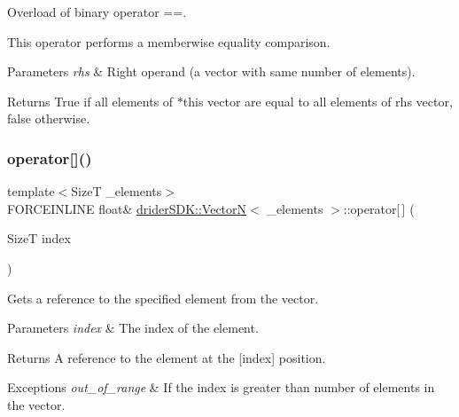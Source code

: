 Overload of binary operator ==.

This operator performs a memberwise equality comparison.


\begin{DoxyParams}{Parameters}
{\em rhs} & Right operand (a vector with same number of elements).\\
\hline
\end{DoxyParams}
\begin{DoxyReturn}{Returns}
True if all elements of $\ast$this vector are equal to all elements of rhs vector, false otherwise. 
\end{DoxyReturn}
\mbox{\label{classdrider_s_d_k_1_1_vector_n_a8f090f0b90344080de98745f8f2bc6fb}} 
\subsubsection{\texorpdfstring{operator[]()}{operator[]()}\hspace{0.1cm}{\footnotesize\ttfamily [1/2]}}
{\footnotesize\ttfamily template$<$SizeT \+\_\+elements$>$ \\
F\+O\+R\+C\+E\+I\+N\+L\+I\+NE float\& \hyperlink{classdrider_s_d_k_1_1_vector_n}{drider\+S\+D\+K\+::\+VectorN}$<$ \+\_\+elements $>$\+::operator\mbox{[}$\,$\mbox{]} (\begin{DoxyParamCaption}\item[{SizeT}]{index }\end{DoxyParamCaption})\hspace{0.3cm}{\ttfamily [inline]}}

Gets a reference to the specified element from the vector.


\begin{DoxyParams}{Parameters}
{\em index} & The index of the element.\\
\hline
\end{DoxyParams}
\begin{DoxyReturn}{Returns}
A reference to the element at the \mbox{[}index\mbox{]} position.
\end{DoxyReturn}

\begin{DoxyExceptions}{Exceptions}
{\em out\+\_\+of\+\_\+range} & If the index is greater than number of elements in the vector. \\
\hline
\end{DoxyExceptions}
\mbox{\label{classdrider_s_d_k_1_1_vector_n_a39f258b71bfa7e6d5d87f855206e4e28}} 

